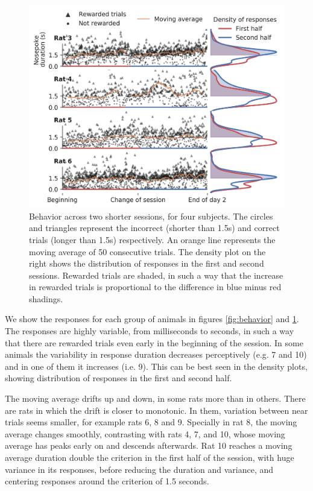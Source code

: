     \begin{figure}[ht!]
        \centering
        \includegraphics[width=\textwidth]{figures/behavior_group_2_with_avg_bold.png}
        \caption[Behavior across two sessions]{Behavior across two shorter sessions, for four subjects. The circles and triangles represent the incorrect (shorter than 1.5s) and correct trials (longer than 1.5s) respectively. An orange line represents the moving average of 50 consecutive trials. The density plot on the right shows the distribution of responses in the first and second sessions. Rewarded trials are shaded, in such a way that the increase in rewarded trials is proportional to the difference in blue minus red shadings.}
        \label{fig:behavior2}
    \end{figure}
    
    We show the responses for each group of animals in figures \ref{fig:behavior} and \ref{fig:behavior2}. The responses are highly variable, from milliseconds to seconds, in such a way that there are rewarded trials even early in the beginning of the session. In some animals the variability in response duration decreases perceptively (e.g. 7 and 10) and in one of them it increases (i.e. 9). This can be best seen in the density plots, showing distribution of responses in the first and second half.
    
    The moving average drifts up and down, in some rats more than in others. There are rats in which the drift is closer to monotonic. In them, variation between near trials seems smaller, for example rats 6, 8 and 9. Specially in rat 8, the moving average changes smoothly, contrasting with rats 4, 7, and 10, whose moving average has peaks early on and descends afterwards. Rat 10 reaches a moving average duration double the criterion in the first half of the session, with huge variance in its responses, before reducing the duration and variance, and centering responses around the criterion of 1.5 seconds.

